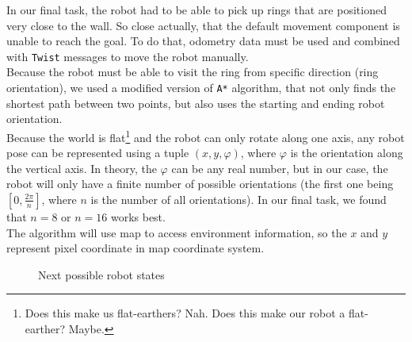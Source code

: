 \documentclass[12pt,a4paper]{article}
\begin{document}
	In our final task, the robot had to be able to pick up rings that are positioned very close to the wall. So close actually, that the default movement component is unable to reach the goal. To do that, odometry data must be used and combined with \texttt{Twist} messages to move the robot manually. \\
	
	Because the robot must be able to visit the ring from specific direction (ring orientation), we used a modified version of \texttt{A*} algorithm, that not only finds the shortest path between two points, but also uses the starting and ending robot orientation. \\
	
	Because the world is flat\footnote{Does this make us flat-earthers? Nah. Does this make our robot a flat-earther? Maybe.} and the robot can only rotate along one axis, any robot pose can be represented using a tuple $(x, y, \varphi)$, where $\varphi$ is the orientation along the vertical axis. In theory, the $\varphi$ can be any real number, but in our case, the robot will only have a finite number of possible orientations (the first one being $[0, \frac{2\pi}{n}]$, where $n$ is the number of all orientations). In our final task, we found that $n = 8$ or $n = 16$ works best. \\

	The algorithm will use map to access environment information, so the $x$ and $y$ represent pixel coordinate in map coordinate system. \\
	
	\begin{figure}[H]
		\centering
		
		\caption{Next possible robot states}
		\label{fig:next_robot_states}
	\end{figure}
	
\end{document}
